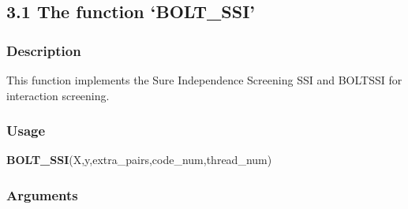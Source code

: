 \documentclass[]{article}
\newenvironment{Shaded}{\begin{snugshade}}{\end{snugshade}}
\newcommand{\KeywordTok}[1]{\textcolor[rgb]{0.13,0.29,0.53}{\textbf{#1}}}
\newcommand{\NormalTok}[1]{#1}
\begin{document}
\subsection{\texorpdfstring{3.1 The function
`BOLT\_SSI'}{3.1 The function BOLT\_SSI}}\label{the-function-bolt_ssi}

\subsubsection{Description}\label{description}

This function implements the Sure Independence Screening SSI and BOLTSSI
for interaction screening.

\subsubsection{Usage}\label{usage}

\begin{Shaded}
\begin{Highlighting}[]
\KeywordTok{BOLT_SSI}\NormalTok{(X,y,extra_pairs,code_num,thread_num)}
\end{Highlighting}
\end{Shaded}

\subsubsection{Arguments}\label{arguments}
\end{document}
